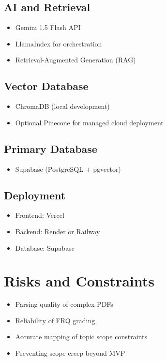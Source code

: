 \documentclass[11pt]{article}
\begin{document}
\subsection{AI and Retrieval}
\begin{itemize}
\item Gemini 1.5 Flash API
\item LlamaIndex for orchestration
\item Retrieval-Augmented Generation (RAG)
\end{itemize}

\subsection{Vector Database}
\begin{itemize}
\item ChromaDB (local development)
\item Optional Pinecone for managed cloud deployment
\end{itemize}

\subsection{Primary Database}
\begin{itemize}
\item Supabase (PostgreSQL + pgvector)
\end{itemize}

\subsection{Deployment}
\begin{itemize}
\item Frontend: Vercel
\item Backend: Render or Railway
\item Database: Supabase
\end{itemize}

\section{Risks and Constraints}

\begin{itemize}
\item Parsing quality of complex PDFs
\item Reliability of FRQ grading
\item Accurate mapping of topic scope constraints
\item Preventing scope creep beyond MVP
\end{itemize}
\end{document}
